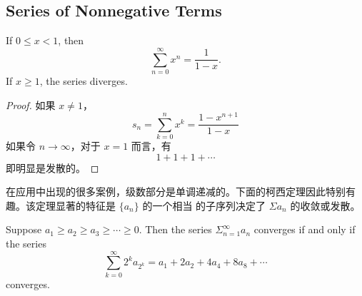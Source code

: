 \documentclass[../poma-notes.tex]{subfiles}
\begin{document}
\subsection*{Series of Nonnegative Terms}

\begin{theorem}
  If $0 \le x < 1$, then
  \[ \sum_{n=0}^{\infty} x^n = \frac{1}{1-x}. \]
  If $x \ge 1$, the series diverges.
\end{theorem}

\begin{proof}
  如果 $x \ne 1$，
  \[ s_n = \sum_{k=0}^{n} x^k = \frac{1-x^{n+1}}{1-x} \]
  如果令 $n \to \infty$，对于 $x=1$ 而言，有
  \[ 1 + 1 + 1 + \cdots \]
  即明显是发散的。
\end{proof}

在应用中出现的很多案例，级数部分是单调递减的。下面的柯西定理因此特别有趣。该定理显著的特征是 $\{a_n\}$ 的一个相当  的子序列决定了 $\Sigma a_n$
的收敛或发散。

\begin{theorem}
  Suppose $a_1 \ge a_2 \ge a_3 \ge \cdots \ge 0$. Then the series $\Sigma_{n=1}^{\infty} a_n$ converges if and only if the series
  \begin{equation}
    \sum_{k=0}^{\infty} 2^k a_{2^k} = a_1 + 2a_2 + 4a_4 + 8a_8 + \cdots
  \end{equation}
  converges.
\end{theorem}

\end{document}
